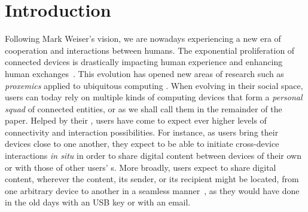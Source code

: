 \section{Introduction}

Following Mark Weiser's vision, we are nowadays
experiencing a new era of cooperation and interactions between humans.
The exponential proliferation of connected devices is
drastically impacting human experience and enhancing human
exchanges~\cite{Dearman:2008, Oh:2017, Sohn:2008,Harper08}. This evolution has opened new areas of research such as
\textit{proxemics} applied to ubiquitous computing
\cite{Marquardt:2011}. When evolving in their social space, users can today rely on
multiple kinds of computing devices that form a \textit{personal squad} of connected entities, or \squad as we shall call them in the remainder of the
paper. Helped by their \squad, users
have come to expect ever higher levels of connectivity and interaction
possibilities. For instance, as users bring
their devices close to one another, they expect to be able to initiate cross-device
interactions \textit{in situ} in order to share digital content
\cite{Oh:2017} between devices of their own \squad or with those of other users' \squad{}s. More broadly, users expect to share digital content,
wherever the content, its sender, or its recipient might be located, from one
arbitrary device to another in a seamless manner~\cite{Dearman:2008}, as they
would have done in the old days with an USB key or with an email. 

